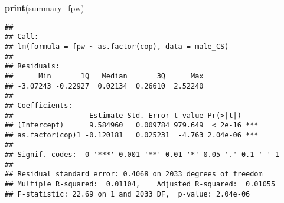 \documentclass[
]{article}
\newenvironment{Shaded}{\begin{snugshade}}{\end{snugshade}}
\newcommand{\FunctionTok}[1]{\textcolor[rgb]{0.13,0.29,0.53}{\textbf{#1}}}
\newcommand{\NormalTok}[1]{#1}
\begin{document}
\begin{Shaded}
\begin{Highlighting}[]
\FunctionTok{print}\NormalTok{(summary\_fpw)}
\end{Highlighting}
\end{Shaded}

\begin{verbatim}
## 
## Call:
## lm(formula = fpw ~ as.factor(cop), data = male_CS)
## 
## Residuals:
##      Min       1Q   Median       3Q      Max 
## -3.07243 -0.22927  0.02134  0.26610  2.52240 
## 
## Coefficients:
##                  Estimate Std. Error t value Pr(>|t|)    
## (Intercept)      9.584960   0.009784 979.649  < 2e-16 ***
## as.factor(cop)1 -0.120181   0.025231  -4.763 2.04e-06 ***
## ---
## Signif. codes:  0 '***' 0.001 '**' 0.01 '*' 0.05 '.' 0.1 ' ' 1
## 
## Residual standard error: 0.4068 on 2033 degrees of freedom
## Multiple R-squared:  0.01104,    Adjusted R-squared:  0.01055 
## F-statistic: 22.69 on 1 and 2033 DF,  p-value: 2.04e-06
\end{verbatim}
\end{document}
